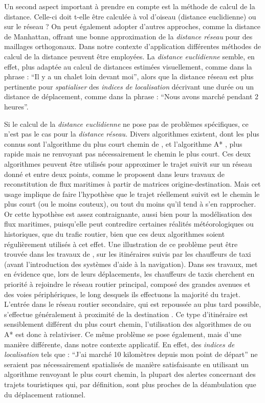 Un second aspect important à prendre en compte est la méthode de
calcul de la distance. Celle-ci doit t-elle être calculée à vol
d'oiseau (\ie distance euclidienne) ou sur le réseau ? On peut
également adopter d'autres approches, comme la distance de Manhattan,
offrant une bonne approximation de la \emph{distance réseau} pour des
maillages orthogonaux. Dans notre contexte d’application différentes
méthodes de calcul de la distance peuvent être employées. La
\emph{distance euclidienne} semble, en effet, plus adaptée au calcul
de distances estimées visuellement, comme dans la phrase : \enquote{Il
  y a un chalet loin devant moi}, alors que la distance réseau est
plus pertinente pour \emph{spatialiser} des \emph{indices de
  localisation} décrivant une durée ou un distance de déplacement,
comme dans la phrase : \enquote{Nous avons marché pendant 2 heures}.

Si le calcul de la \emph{distance euclidienne} ne pose pas de
problèmes spécifiques, ce n'est pas le cas pour la \emph{distance
  réseau.}  Divers algorithmes existent, dont les plus connus sont
l'algorithme du plus court chemin de \textcite{Dijkstra1959}, et
l'algorithme A* \autocite{Hart1968}, plus rapide mais ne renvoyant pas
nécessairement le chemin le plus court. Ces deux algorithmes peuvent
être utilisés pour approximer le trajet suivit sur un réseau donné et
entre deux points, comme le proposent \textcite{Berli2018, Bunel2018}
dans leurs travaux de reconstitution de flux maritimes à partir de
matrices origine-destination. Mais cet usage implique de faire
l'hypothèse que le trajet réellement suivit est le chemin le plus
court (ou le moins couteux), ou tout du moins qu'il tend à s'en
rapprocher. Or cette hypothèse est assez contraignante, aussi bien
pour la modélisation des flux maritimes, puisqu'elle peut contredire
certaines réalités météorologiques ou historiques, que du trafic
routier, bien que ces deux algorithmes soient régulièrement utilisés à
cet effet. Une illustration de ce problème peut être trouvée dans les
travaux de \textcite{Pailhous1970}, sur les itinéraires suivis par les
chauffeurs de taxi (avant l'introduction des systèmes d'aide à la
navigation). Dans ses travaux, \textcite{Pailhous1970} met en évidence
que, lors de leurs déplacements, les chauffeurs de taxis cherchent en
priorité à rejoindre le réseau routier principal, composé des grandes
avenues et des voies périphériques, le long desquels ils effectuons la
majorité du trajet. L'entrée dans le réseau routier secondaire, qui
est repoussée au plus tard possible, s'effectue généralement à
proximité de la destination \autocite{Lagesse2016}. Ce type
d'itinéraire est sensiblement différent du plus court chemin,
l'utilisation des algorithmes de \textcite{Dijkstra1959} ou A*
\autocite{Hart1968} est donc à relativiser. Ce même problème se pose
également, mais d'une manière différente, dans notre contexte
applicatif. En effet, des \emph{indices de localisation} tels que :
\enquote{J'ai marché 10 kilomètres depuis mon point de départ} ne
seraient pas nécessairement spatialisés de manière satisfaisante en
utilisant un algorithme renvoyant le plus court chemin, la plupart des
alertes concernant des trajets touristiques qui, par définition, sont
plus proches de la déambulation que du déplacement rationnel.

